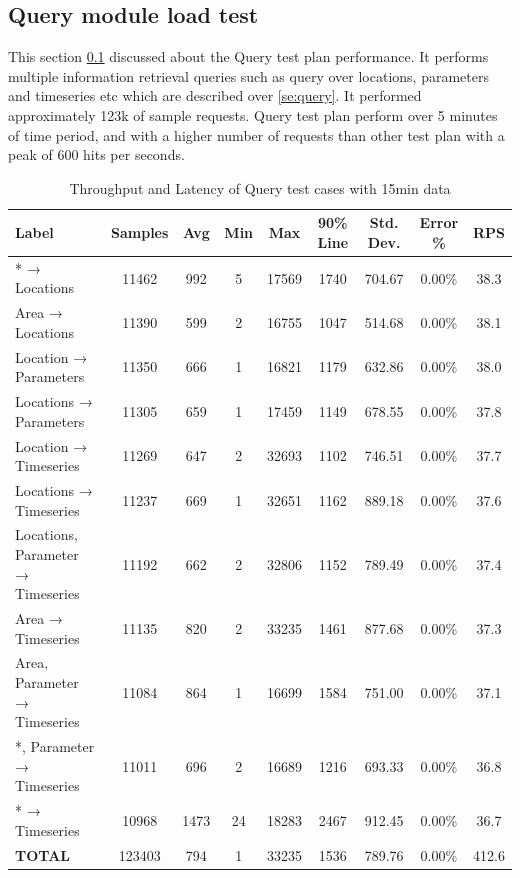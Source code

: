 \subsection{Query module load test}
\label{subse:obs_test_plan_query_15min}
This section \ref{subse:obs_test_plan_query_15min} discussed about the Query test plan performance. It performs multiple information retrieval queries such as query over locations, parameters and timeseries etc which are described over \ref{se:query}. It performed approximately 123k of sample requests.
Query test plan perform over 5 minutes of time period, and with a higher number of requests than other test plan with a peak of 600 hits per seconds.

\begin{table}[ht]
\footnotesize
\begin{tabulary}{\linewidth}{|L|C|C|C|C|C|C|C|C|}
\hline
Label & Samples & Avg & Min & Max & 90\% Line & Std. Dev. & Error \% & RPS \\ \hline
* → Locations & 11462 & 992 & 5 & 17569 & 1740 & 704.67 & 0.00\% & 38.3 \\ \hline
Area → Locations & 11390 & 599 & 2 & 16755 & 1047 & 514.68 & 0.00\% & 38.1 \\ \hline
Location → Parameters & 11350 & 666 & 1 & 16821 & 1179 & 632.86 & 0.00\% & 38.0 \\ \hline
Locations → Parameters & 11305 & 659 & 1 & 17459 & 1149 & 678.55 & 0.00\% & 37.8 \\ \hline
Location → Timeseries & 11269 & 647 & 2 & 32693 & 1102 & 746.51 & 0.00\% & 37.7 \\ \hline
Locations → Timeseries & 11237 & 669 & 1 & 32651 & 1162 & 889.18 & 0.00\% & 37.6 \\ \hline
Locations, Parameter → Timeseries & 11192 & 662 & 2 & 32806 & 1152 & 789.49 & 0.00\% & 37.4 \\ \hline
Area → Timeseries & 11135 & 820 & 2 & 33235 & 1461 & 877.68 & 0.00\% & 37.3 \\ \hline
Area, Parameter → Timeseries & 11084 & 864 & 1 & 16699 & 1584 & 751.00 & 0.00\% & 37.1 \\ \hline
*, Parameter → Timeseries & 11011 & 696 & 2 & 16689 & 1216 & 693.33 & 0.00\% & 36.8 \\ \hline
* → Timeseries & 10968 & 1473 & 24 & 18283 & 2467 & 912.45 & 0.00\% & 36.7 \\ \hline
\textbf{TOTAL} & 123403 & 794 & 1 & 33235 & 1536 & 789.76 & 0.00\% & 412.6 \\ \hline
\end{tabulary}
\caption{Throughput and Latency of Query test cases with 15min data}
\label{tab:obs_query_15_min_summary}
\end{table}
